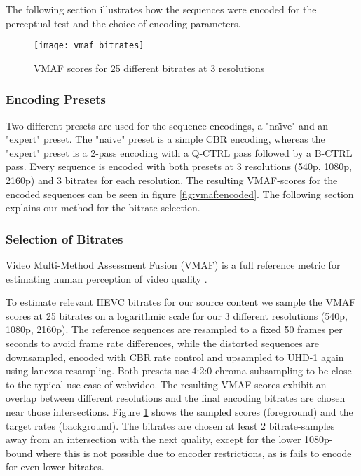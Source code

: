 The following section illustrates how the sequences were encoded for the perceptual test and the choice of encoding parameters.

\begin{figure}[!t]
	\centering
	\texttt{[image: vmaf\_bitrates]}
	\caption{VMAF scores for 25 different bitrates at 3 resolutions}
	\label{fig:vmaf:bitrates}
\end{figure}

\subsubsection{Encoding Presets}
Two different presets are used for the sequence encodings, a "na\"{\i}ve" and an "expert" preset. The  "na\"{\i}ve" preset is a simple CBR encoding, whereas the "expert" preset is a 2-pass encoding with a Q-CTRL pass followed by a B-CTRL pass.  Every sequence is encoded with both presets at 3 resolutions (540p, 1080p, 2160p) and 3 bitrates for each resolution. The resulting VMAF-scores for the encoded sequences can be seen in figure \ref{fig:vmaf:encoded}. The following section explains our method for the bitrate selection.

\subsubsection{Selection of Bitrates}
Video Multi-Method Assessment Fusion (VMAF) is a full reference metric for estimating human perception of video quality \cite{lin2014:fvqa}.

To estimate relevant HEVC bitrates for our source content we sample the VMAF scores at 25 bitrates on a logarithmic scale for our 3 different resolutions (540p, 1080p, 2160p). The reference sequences are resampled to a fixed 50 frames per seconds to avoid frame rate differences, while the distorted sequences are downsampled, encoded with CBR rate control and upsampled to UHD-1 again using lanczos resampling. Both presets use 4:2:0 chroma subsampling to be close to the typical use-case of webvideo. The resulting VMAF scores exhibit an overlap between different resolutions and the final encoding bitrates are chosen near those intersections. Figure \ref{fig:vmaf:bitrates} shows the sampled scores (foreground) and the target rates (background). The bitrates are chosen at least 2 bitrate-samples away from an intersection with the next quality, except for the lower 1080p-bound where this is not possible due to encoder restrictions, as is fails to encode for even lower bitrates.

